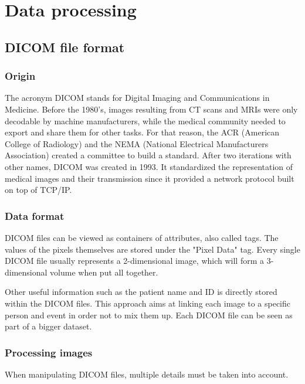 
\chapter{Data processing}
\label{ch:data_processing}

\section{DICOM file format}

\subsection{Origin}

The acronym DICOM stands for Digital Imaging and Communications in Medicine. Before the 1980’s, images resulting from CT scans and MRIs were only decodable by machine manufacturers, while the medical community needed to export and share them for other tasks. For that reason, the ACR (American College of Radiology) and the NEMA (National Electrical Manufacturers Association) created a committee to build a standard. After two iterations with other names, DICOM was created in 1993. It standardized the representation of medical images and their transmission since it provided a network protocol built on top of TCP/IP.


\subsection{Data format}

DICOM files can be viewed as containers of attributes, also called tags. The values of the pixels themselves are stored under the "Pixel Data" tag. Every single DICOM file usually represents a 2-dimensional image, which will form a 3-dimensional volume when put all together. 

Other useful information such as the patient name and ID is directly stored within the DICOM files. This approach aims at linking each image to a specific person and event in order not to mix them up. Each DICOM file can be seen as part of a bigger dataset. 


\subsection{Processing images}

When manipulating DICOM files, multiple details must be taken into account. 

